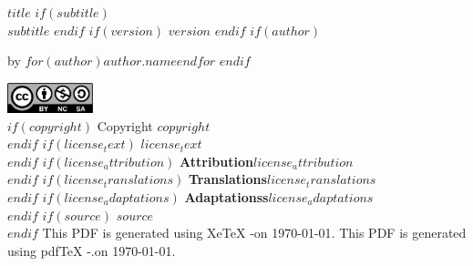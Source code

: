 \documentclass[
    $if(fontsize)$$fontsize$$else$10pt$endif$,
    $if(papersize)$$papersize$$else$letterpaper$endif$,
    titlepage,
    oneside,
    openright,
    $if(draft)$draft$else$final$endif$,
    article]{memoir}
\begin{document}
%
%
\thispagestyle{empty}
\begin{flushleft}
    {\bfseries $title$}
    $if(subtitle)$
        {\\\itshape $subtitle$}
    $endif$
    $if(version)$
        \normalsize {}\space $version$
    $endif$
    \hfill\newline
    $if(author)$

        \normalsize by $for(author)$$author.name$$endfor$
        \vspace*{1em}
    $endif$

    \vspace*{1.5em}

    \includegraphics[keepaspectratio=true, width=2.5cm]{cc_by_nc_sa_40.eps}\\[1.2em]
    \justify
    $if(copyright)$
        \normalsize Copyright \textcopyright\space $copyright$\\[1.2em]
    $endif$
    $if(license_text)$
        \normalsize $license_text$\\[1.2em]
    $endif$
    $if(license_attribution)$
        \normalsize {\bfseries Attribution}\textemdash $license_attribution$\\[1.2em]
    $endif$
    $if(license_translations)$
        \normalsize {\bfseries Translations}\textemdash $license_translations$\\[1.2em]
    $endif$
    $if(license_adaptations)$
        \normalsize {\bfseries Adaptationss}\textemdash $license_adaptations$\\[1.2em]
    $endif$
    $if(source)$
        \normalsize $source$\\[1.2em]
    $endif$
    \ifxetex
        \normalsize This PDF is generated using XeTeX \the\eTeXversion\eTeXrevision-\the\XeTeXversion\XeTeXrevision\space on \today.
    \else
        \normalsize This PDF is generated using pdfTeX \the\eTeXversion\eTeXrevision-\the\pdftexversion.\pdftexrevision\space on \today.
    \fi
\end{flushleft}
\pagebreak

\cleardoublepage
\end{document}
